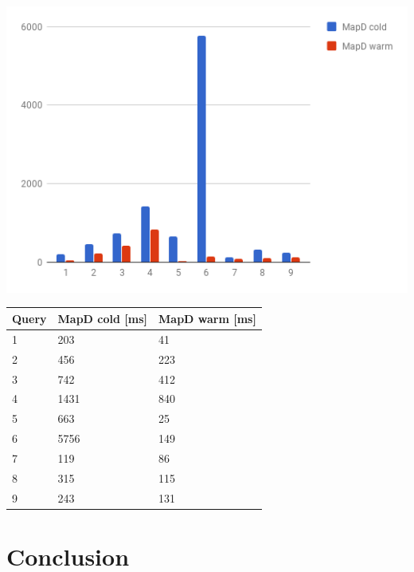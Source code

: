   \begin{minipage}{\textwidth}
  \begin{minipage}[b]{0.59\textwidth}
    \centering
     \includegraphics[width=1.0\textwidth,height=1.0\textheight,keepaspectratio]{images/mapd_cold_vs_warm.png}
    \label{fig:mapd_cold_vs_warm}
  \end{minipage}
  \hfill
  \begin{minipage}[b]{0.39\textwidth}
    \centering
  \begin{tabular}{ |p{1cm}|p{2cm}|p{2cm}| }
    \hline
    Query & MapD cold [ms] & MapD warm [ms]\\
    \hline
    1 & 203 & 41 \\
    2 & 456 & 223 \\
    3 & 742 & 412 \\
    4 & 1431 & 840 \\
    5 & 663 & 25 \\
    6 & 5756 & 149 \\
    7 & 119 & 86 \\
    8 & 315 & 115 \\
    9 & 243 & 131 \\
    \hline
\end{tabular}
            \label{tab:mapd_cold_vs_warm}
    \end{minipage}
 \end{minipage}


\section{Conclusion}